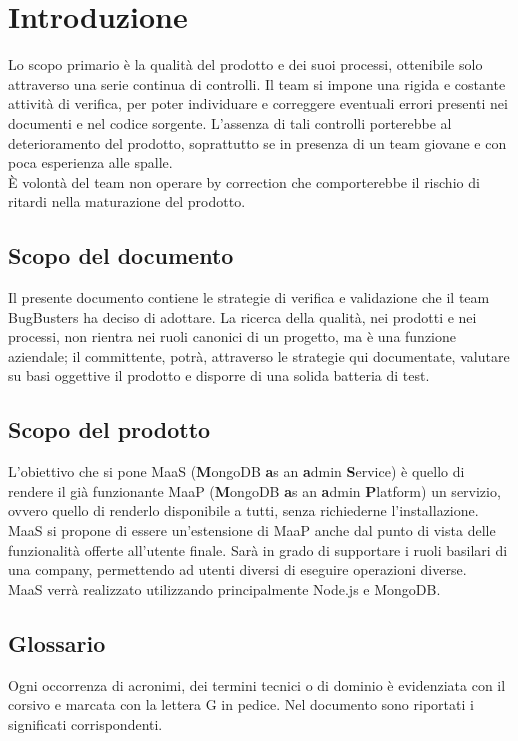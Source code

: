 \section{Introduzione}
Lo scopo primario è la qualità del prodotto e dei suoi processi, ottenibile solo attraverso una serie continua di controlli. Il team si impone una rigida e costante attività di verifica, per poter individuare e correggere eventuali errori presenti nei documenti e nel codice sorgente. L'assenza di tali controlli porterebbe al deterioramento del prodotto, soprattutto se in presenza di un team giovane e con poca esperienza alle spalle. \\
È volontà del team non operare by correction che comporterebbe il rischio di ritardi nella maturazione del prodotto.

\subsection{Scopo del documento}
Il presente documento contiene le strategie di verifica e validazione che il team BugBusters ha deciso di adottare. La ricerca della qualità, nei prodotti e nei processi, non rientra nei ruoli canonici di un progetto, ma è una funzione aziendale; il committente, potrà, attraverso le strategie qui documentate, valutare su basi oggettive il prodotto e disporre di una solida batteria di test.

\subsection{Scopo del prodotto}
L'obiettivo che si pone MaaS (\textbf{M}ongoDB \textbf{a}s an \textbf{a}dmin \textbf{S}ervice) è quello di rendere il già funzionante MaaP (\textbf{M}ongoDB \textbf{a}s an \textbf{a}dmin \textbf{P}latform) un servizio, ovvero quello di renderlo disponibile a tutti, senza richiederne l'installazione. MaaS si propone di essere un'estensione di MaaP anche dal punto di vista delle funzionalità offerte all'utente finale. Sarà in grado di supportare i ruoli basilari di una company, permettendo ad utenti diversi di eseguire operazioni diverse. \\
MaaS verrà realizzato utilizzando principalmente Node.js e MongoDB.

\subsection{Glossario}
Ogni occorrenza di acronimi, dei termini tecnici o di dominio è evidenziata con il corsivo e marcata con la lettera G in pedice. Nel documento \Glossario sono riportati i significati corrispondenti.

